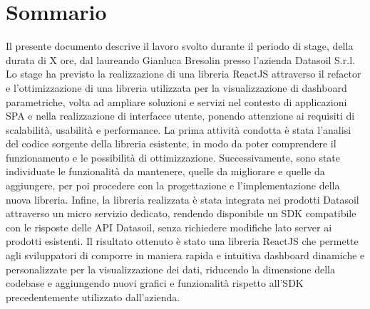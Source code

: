 \cleardoublepage
{}
{}
\begingroup
\let\clearpage\relax
\let\cleardoublepage\relax
\chapter*{Sommario}

Il presente documento descrive il lavoro svolto durante il periodo di stage, della durata di X ore, dal laureando Gianluca Bresolin
presso l'azienda Datasoil S.r.l. Lo stage ha previsto la realizzazione di una libreria ReactJS attraverso il refactor
e l'ottimizzazione di una libreria utilizzata per la visualizzazione di dashboard parametriche, volta ad ampliare soluzioni e servizi
nel contesto di applicazioni SPA e nella realizzazione di interfacce utente, ponendo attenzione ai requisiti di scalabilità,
usabilità e performance. \newline
La prima attività condotta è stata l'analisi del codice sorgente della libreria esistente, in modo da poter comprendere il funzionamento e le possibilità
di ottimizzazione. Successivamente, sono state individuate le funzionalità da mantenere, quelle da migliorare e quelle da aggiungere,
per poi procedere con la progettazione e l'implementazione della nuova libreria. \newline
Infine, la libreria realizzata è stata integrata nei prodotti Datasoil attraverso un micro servizio dedicato, rendendo disponibile un SDK
compatibile con le risposte delle API Datasoil, senza richiedere modifiche lato server ai prodotti esistenti. \newline
Il risultato ottenuto è stato una libreria ReactJS che permette agli sviluppatori di comporre in maniera rapida e intuitiva dashboard
dinamiche e personalizzate per la visualizzazione dei dati, riducendo la dimensione della codebase e aggiungendo nuovi grafici e funzionalità
rispetto all'SDK precedentemente utilizzato dall'azienda.


\endgroup
\vfill

